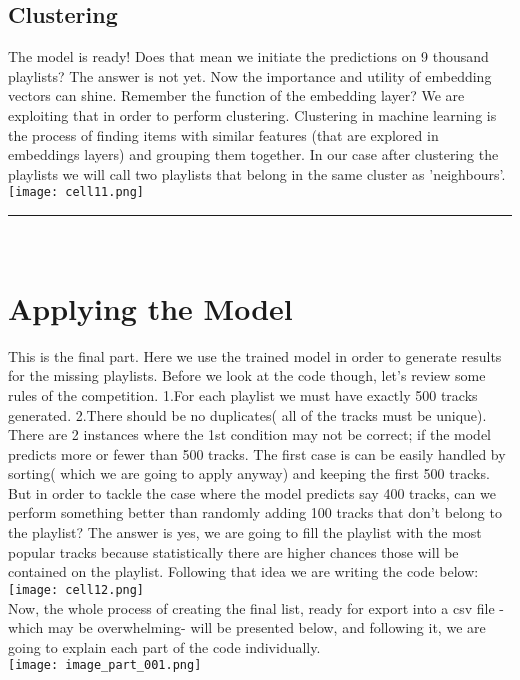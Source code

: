 \documentclass[]{article}
\begin{document}
\subsection{Clustering}
The model is ready! Does that mean we initiate the predictions on 9 thousand playlists? The answer is not yet. Now the importance and utility of embedding vectors can shine. Remember the function of the embedding layer? We are exploiting that in order to perform clustering. Clustering in machine learning is the process of finding items with similar features (that are explored in embeddings layers) and grouping them together. In our case after clustering the playlists we will call two playlists that belong in the same cluster as 'neighbours'. 
\\
\texttt{[image: cell11.png]}
\noindent
{\color{blue} \rule{\linewidth}{0.4mm}}
\\

\section{Applying the Model}
This is the final part. Here we use the trained model in order to generate results for the missing playlists. Before we look at the code though, let's review some rules of the competition. 1.For each playlist we must have exactly 500 tracks generated. 2.There should be no duplicates( all of the tracks must be unique). There are 2 instances where the 1st condition may not be correct; if the model predicts more or fewer than 500 tracks. The first case is can be easily handled by sorting( which we are going to apply anyway) and keeping the first 500 tracks. But in order to tackle the case where the model predicts say 400 tracks, can we perform something better than randomly adding 100 tracks that don't belong to the playlist? The answer is yes, we are going to fill the playlist with the most popular tracks because statistically there are higher chances those will be contained on the playlist. Following that idea we are writing the code below:
\\
\texttt{[image: cell12.png]}
\noindent
\\

Now, the whole process of creating the final list, ready for export into a csv file -which may be overwhelming- will be presented
below, and following it, we are going to explain each part of the code individually.
\\
\texttt{[image: image\_part\_001.png]}
\end{document}
